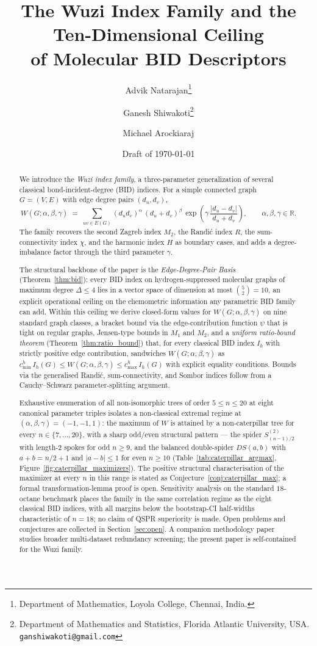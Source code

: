 \documentclass[11pt,a4paper]{article}
\title{\bfseries The Wuzi Index Family and the Ten-Dimensional Ceiling\\ of Molecular BID Descriptors}
\author{
  Advik Natarajan\thanks{Department of Mathematics, Loyola College, Chennai, India.} \and
  Ganesh Shiwakoti\thanks{Department of Mathematics and Statistics, Florida Atlantic University, USA. \texttt{ganshiwakoti@gmail.com}} \and
  Michael Arockiaraj\footnotemark[1]
}
\date{Draft of \today}
\theoremstyle{definition}
\newcommand{\Wuzi}{W(G;\alpha,\beta,\gamma)}
\begin{document}
\maketitle

\begin{abstract}
We introduce the \emph{Wuzi index family}, a three-parameter
generalization of several classical bond-incident-degree (BID)
indices. For a simple connected graph $G = (V, E)$ with edge degree
pairs $(d_u, d_v)$,
\[
\Wuzi
\;=\; \sum_{uv \in E(G)}
(d_u d_v)^{\alpha}\,(d_u + d_v)^{\beta}\,
\exp\!\left(\gamma\,\frac{|d_u - d_v|}{d_u + d_v}\right),
\qquad
\alpha, \beta, \gamma \in \mathbb{R}.
\]
The family recovers the second Zagreb index $M_2$, the Randi\'c
index $R$, the sum-connectivity index $\chi$, and the harmonic
index $H$ as boundary cases, and adds a degree-imbalance factor
through the third parameter $\gamma$.

The structural backbone of the paper is the
\emph{Edge-Degree-Pair Basis} (Theorem~\ref{thm:bid}): every BID
index on hydrogen-suppressed molecular graphs of maximum degree
$\Delta \le 4$ lies in a vector space of dimension at most
$\binom{5}{2} = 10$, an explicit operational ceiling on the
chemometric information any parametric BID family can add. Within
this ceiling we derive closed-form values for $\Wuzi$ on nine
standard graph classes, a bracket bound via the edge-contribution
function $\psi$ that is tight on regular graphs, Jensen-type bounds
in $M_1$ and $M_2$, and a \emph{uniform ratio-bound theorem}
(Theorem~\ref{thm:ratio_bound}) that, for every classical BID index
$I_h$ with strictly positive edge contribution, sandwiches $\Wuzi$
as $c_{\min}^{h}\, I_h(G) \le \Wuzi \le c_{\max}^{h}\, I_h(G)$ with
explicit equality conditions. Bounds via the generalised Randi\'c,
sum-connectivity, and Sombor indices follow from a Cauchy--Schwarz
parameter-splitting argument.

Exhaustive enumeration of all non-isomorphic trees of order
$5 \le n \le 20$ at eight canonical parameter triples isolates a
non-classical extremal regime at
$(\alpha, \beta, \gamma) = (-1, -1, 1)$: the maximum of $W$ is
attained by a non-caterpillar tree for every $n \in \{7, \ldots, 20\}$,
with a sharp odd/even structural pattern --- the spider $S^{(2)}_{(n-1)/2}$
with length-$2$ spokes for odd $n \ge 9$, and the balanced
double-spider $DS(a, b)$ with $a + b = n/2 + 1$ and $|a - b| \le 1$
for even $n \ge 10$
(Table~\ref{tab:caterpillar_argmax},
Figure~\ref{fig:caterpillar_maximizers}). The positive
structural characterisation of the maximizer at every $n$ in this
range is stated as Conjecture~\ref{conj:caterpillar_max}; a formal
transformation-lemma proof is open. Sensitivity analysis on
the standard $18$-octane benchmark places the family in the same
correlation regime as the eight classical BID indices, with all
margins below the bootstrap-CI half-widths characteristic of $n = 18$;
no claim of QSPR superiority is made. Open problems and conjectures
are collected in Section~\ref{sec:open}. A companion methodology
paper~\cite{Paper2_Screening} studies broader multi-dataset
redundancy screening; the present paper is self-contained for the
Wuzi family.


\end{abstract}
\end{document}
